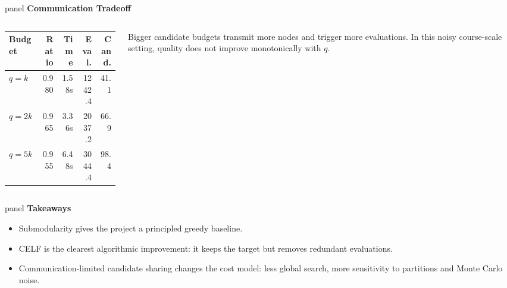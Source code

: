 \documentclass[final]{beamer}
\newcommand{\panel}[2]{%
  \begin{beamercolorbox}[wd=\linewidth,sep=0.46cm,rounded=true]{panel}
    {\color{deepteal}\bfseries\Large #1}\par
    \vspace{0.26cm}
    #2
  \end{beamercolorbox}
}
\begin{document}
\begin{frame}[t]
\begin{columns}[t,totalwidth=\textwidth]
\begin{column}{0.365\textwidth}
\vspace{0.50cm}
\panel{Communication Tradeoff}{
  \begin{columns}[T,totalwidth=\linewidth]
    \begin{column}{0.42\linewidth}
      \centering
      \begin{tabular}{lrrrr}
        \toprule
        Budget & Ratio & Time & Eval. & Cand. \\
        \midrule
        \(q=k\) & 0.980 & 1.58s & 1242.4 & 41.1 \\
        \(q=2k\) & 0.965 & 3.36s & 2037.2 & 66.9 \\
        \(q=5k\) & 0.955 & 6.48s & 3044.4 & 98.4 \\
        \bottomrule
      \end{tabular}
    \end{column}
    \begin{column}{0.54\linewidth}
      Bigger candidate budgets transmit more nodes and trigger more evaluations. In this noisy course-scale setting, quality does not improve monotonically with \(q\).
    \end{column}
  \end{columns}
}

\vspace{0.50cm}
\panel{Takeaways}{
  \begin{itemize}
    \item Submodularity gives the project a principled greedy baseline.
    \item CELF is the clearest algorithmic improvement: it keeps the target but removes redundant evaluations.
    \item Communication-limited candidate sharing changes the cost model: less global search, more sensitivity to partitions and Monte Carlo noise.
  \end{itemize}
}
\end{column}

\end{columns}


\end{frame}
\end{document}
